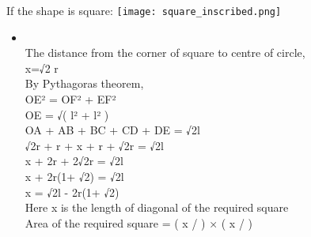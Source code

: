 \documentclass[10pt]{beamer}
\begin{document}
\begin{frame}{If the shape is square:}
\texttt{[image: square\_inscribed.png]}
\begin{wrapfigure}{\hspace{10}}{\textwidth}
\caption{}
\label{fig:wrapfig}
\end{wrapfigure}
\begin{itemize}
\item \\
The distance from the corner of square to centre of circle, \\ x=√2 r \\ By Pythagoras theorem, \\
OE² = OF² + EF² \\
OE = √( l² + l² ) \\
OA + AB + BC + CD + DE = √2l
\\ √2r + r + x + r + √2r = √2l \\
x + 2r + 2√2r = √2l \\
x + 2r(1+ √2) = √2l \\
x = √2l - 2r(1+ √2) \\
Here x is the length of diagonal of the required square \\
Area of the required square = ( x /  ) × ( x /  ) \\
\end{itemize}
\end{frame}
\end{document}
